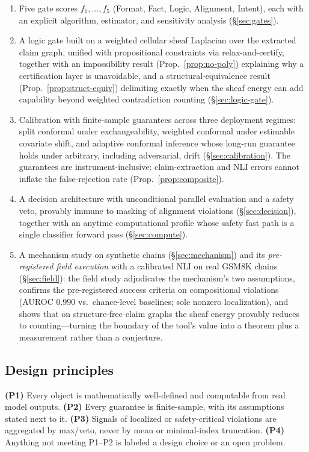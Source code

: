 \begin{enumerate}
\item Five gate scores $f_1,\dots,f_5$ (Format, Fact, Logic, Alignment,
Intent), each with an explicit algorithm, estimator, and sensitivity analysis
(\S\ref{sec:gates}).
\item A logic gate built on a weighted cellular sheaf Laplacian over the
extracted claim graph, unified with propositional constraints via
relax-and-certify, together with an impossibility result
(Prop.~\ref{prop:no-poly}) explaining why a certification layer is
unavoidable, and a structural-equivalence result
(Prop.~\ref{prop:struct-equiv}) delimiting exactly when the sheaf energy can
add capability beyond weighted contradiction counting
(\S\ref{sec:logic-gate}).
\item Calibration with finite-sample guarantees across three deployment
regimes: split conformal under exchangeability, weighted conformal under
estimable covariate shift, and adaptive conformal inference whose long-run
guarantee holds under arbitrary, including adversarial, drift
(\S\ref{sec:calibration}). The guarantees are instrument-inclusive:
claim-extraction and NLI errors cannot inflate the false-rejection rate
(Prop.~\ref{prop:composite}).
\item A decision architecture with unconditional parallel evaluation and a
safety veto, provably immune to masking of alignment violations
(\S\ref{sec:decision}), together with an anytime computational profile whose
safety fast path is a single classifier forward pass (\S\ref{sec:compute}).
\item A mechanism study on synthetic chains (\S\ref{sec:mechanism}) and its
\emph{pre-registered field execution} with a calibrated NLI on real GSM8K
chains (\S\ref{sec:field}): the field study adjudicates the mechanism's two
assumptions, confirms the pre-registered success criteria on compositional
violations (AUROC $0.990$ vs.\ chance-level baselines; sole nonzero
localization), and shows that on structure-free claim graphs the sheaf energy
provably reduces to counting---turning the boundary of the tool's value into a
theorem plus a measurement rather than a conjecture.
\end{enumerate}

\subsection{Design principles}

\textbf{(P1)} Every object is mathematically well-defined and computable from
real model outputs. \textbf{(P2)} Every guarantee is finite-sample, with its
assumptions stated next to it. \textbf{(P3)} Signals of localized or
safety-critical violations are aggregated by max/veto, never by mean or
minimal-index truncation. \textbf{(P4)} Anything not meeting P1--P2 is labeled
a design choice or an open problem.

